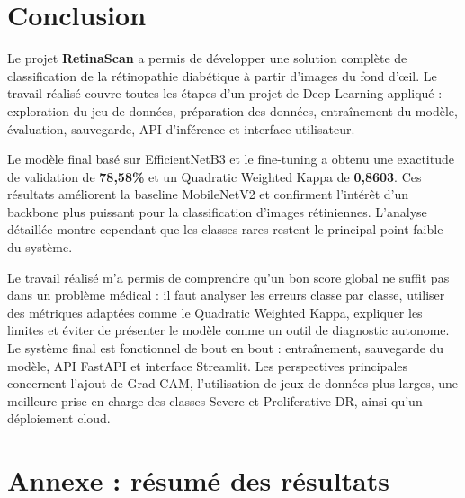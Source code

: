 \documentclass[12pt,a4paper]{report}
\begin{document}
\chapter{Conclusion}
Le projet \textbf{RetinaScan} a permis de développer une solution complète de classification de la rétinopathie diabétique à partir d'images du fond d'œil. Le travail réalisé couvre toutes les étapes d'un projet de Deep Learning appliqué : exploration du jeu de données, préparation des données, entraînement du modèle, évaluation, sauvegarde, API d'inférence et interface utilisateur.

Le modèle final basé sur EfficientNetB3 et le fine-tuning a obtenu une exactitude de validation de \textbf{78,58\%} et un Quadratic Weighted Kappa de \textbf{0,8603}. Ces résultats améliorent la baseline MobileNetV2 et confirment l'intérêt d'un backbone plus puissant pour la classification d'images rétiniennes. L'analyse détaillée montre cependant que les classes rares restent le principal point faible du système.

Le travail réalisé m'a permis de comprendre qu'un bon score global ne suffit pas dans un problème médical : il faut analyser les erreurs classe par classe, utiliser des métriques adaptées comme le Quadratic Weighted Kappa, expliquer les limites et éviter de présenter le modèle comme un outil de diagnostic autonome. Le système final est fonctionnel de bout en bout : entraînement, sauvegarde du modèle, API FastAPI et interface Streamlit. Les perspectives principales concernent l'ajout de Grad-CAM, l'utilisation de jeux de données plus larges, une meilleure prise en charge des classes Severe et Proliferative DR, ainsi qu'un déploiement cloud.

\appendix
\chapter{Annexe : résumé des résultats}
\end{document}
